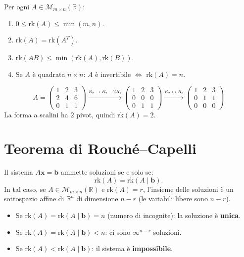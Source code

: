 \begin{theorembox}
Per ogni $A \in \mathcal{M}_{m \times n}(\mathbb{R})$:
\begin{enumerate}
    \item $0 \leq \text{rk}(A) \leq \min(m, n)$.
    \item $\text{rk}(A) = \text{rk}(A^T)$.
    \item $\text{rk}(AB) \leq \min(\text{rk}(A), \text{rk}(B))$.
    \item Se $A$ è quadrata $n \times n$: $A$ è invertibile $\Leftrightarrow$ $\text{rk}(A) = n$.
\end{enumerate}
\end{theorembox}

\begin{examplebox}
\[ A = \begin{pmatrix} 1 & 2 & 3 \\ 2 & 4 & 6 \\ 0 & 1 & 1 \end{pmatrix} \xrightarrow{R_2 \to R_2 - 2R_1} \begin{pmatrix} 1 & 2 & 3 \\ 0 & 0 & 0 \\ 0 & 1 & 1 \end{pmatrix} \xrightarrow{R_2 \leftrightarrow R_3} \begin{pmatrix} 1 & 2 & 3 \\ 0 & 1 & 1 \\ 0 & 0 & 0 \end{pmatrix} \]
La forma a scalini ha $2$ pivot, quindi $\text{rk}(A) = 2$.
\end{examplebox}

\section[Rouch\'e--Capelli]{Teorema di Rouch\'e--Capelli}
\label{sec:rouche-capelli}

\begin{theorembox}
\label{thm:rouche-capelli}
Il sistema $A\mathbf{x} = \mathbf{b}$ ammette soluzioni se e solo se:
\[ \text{rk}(A) = \text{rk}(A \mid \mathbf{b}). \]
In tal caso, se $A \in \mathcal{M}_{m \times n}(\mathbb{R})$ e $\text{rk}(A) = r$, l'insieme delle soluzioni è un sottospazio affine di $\mathbb{R}^n$ di dimensione $n - r$ (le variabili libere sono $n - r$).
\end{theorembox}

\begin{notebox}
\begin{itemize}
    \item Se $\text{rk}(A) = \text{rk}(A \mid \mathbf{b}) = n$ (numero di incognite): la soluzione è \textbf{unica}.
    \item Se $\text{rk}(A) = \text{rk}(A \mid \mathbf{b}) < n$: ci sono $\infty^{n-r}$ soluzioni.
    \item Se $\text{rk}(A) < \text{rk}(A \mid \mathbf{b})$: il sistema è \textbf{impossibile}.
\end{itemize}
\end{notebox}

